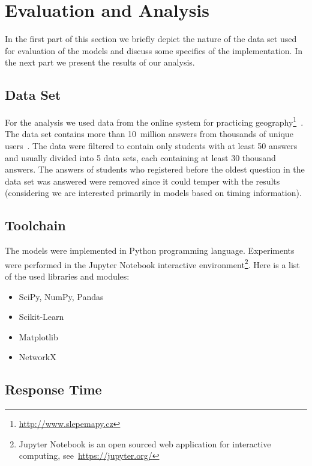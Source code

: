 \chapter{Evaluation and Analysis}

In the first part of this section we briefly depict the nature of the data set used for evaluation of the models and discuss some specifics of the implementation. In the next part we present the results of our analysis.

\section{Data Set}


For the analysis we used data from the online system for practicing geography\footnote{\url{http://www.slepemapy.cz}}~\cite{Papousek2014}. The data set contains more than 10~million answers from thousands of unique users~\cite{Papousek2015}. The data were filtered to contain only students with at least 50 answers and usually divided into 5 data sets, each containing at least 30 thousand answers. The answers of students who registered before the oldest question in the data set was answered were removed since it could temper with the results (considering we are interested primarily in models based on timing information).

\section{Toolchain}

The models were implemented in Python programming language. Experiments were performed in the Jupyter Notebook interactive environment\footnote{Jupyter Notebook is an open sourced web application for interactive computing, see~\url{https://jupyter.org/}}. Here is a list of the used libraries and modules:

\begin{itemize}
  \item SciPy, NumPy, Pandas
  \item Scikit-Learn
  \item Matplotlib
  \item NetworkX
\end{itemize}

\section{Response Time}


